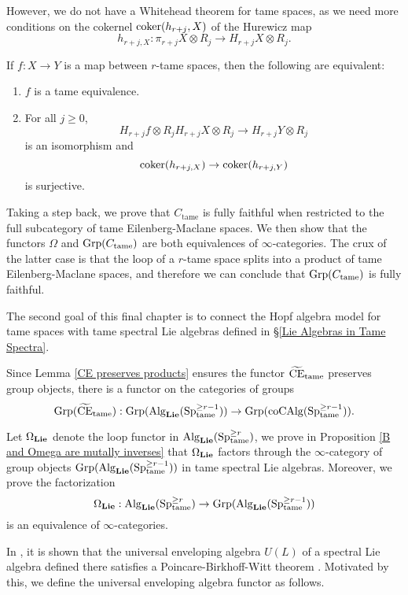 	However, we do not have a Whitehead theorem for tame spaces, as we need more conditions on the cokernel $\operatorname{coker}(h_{r+j}, X)$ of the Hurewicz map
	$$
	h_{r+j,X}: \pi_{r+j}X\otimes R_j \to 
	H_{r+j}X\otimes R_j.
	$$
	\begin{proposition}
	\cite[Proposition 1.1]{Felix-LemaireII}
	If $f:X \to Y$ is a map between $r$-tame spaces, then the following are equivalent:
\begin{enumerate}
    \item $f$ is a tame equivalence.
    \item For all $j\geq 0$, 
    $$
    H_{r+j}f \otimes R_j
    H_{r+j}X \otimes R_j
	\to 
	H_{r+j}Y \otimes R_j
    $$
    is an isomorphism and 
    $$
    \operatorname{coker}(h_{r+j,X}) \to \operatorname{coker}(h_{r+j,Y})
    $$
    is surjective.
\end{enumerate}
	\end{proposition}
	
	Taking a step back, we prove that $C_{\operatorname{tame}}$ is fully faithful when restricted to the full subcategory of tame Eilenberg-Maclane spaces.
We then show that the functors $\Omega$ and $\operatorname{Grp}(C_{\operatorname{tame}})$ are both equivalences of $\infty$-categories. 
The crux of the latter case is that the loop of a $r$-tame space splits into a product of tame Eilenberg-Maclane spaces, and therefore we can conclude that $\operatorname{Grp}(C_{\operatorname{tame}})$ is fully faithful.

The second goal of this final chapter is to connect the Hopf algebra model for tame spaces with tame spectral Lie algebras defined in \S \ref{Lie Algebras in Tame Spectra}.

Since Lemma \ref{CE preserves products} ensures the functor $\widetilde{\operatorname{CE}}_{\operatorname{\operatorname{tame}}}$ preserves group objects, there is a functor on the categories of groups
\[
	\operatorname{Grp}(\widetilde{\operatorname{CE}}_{\operatorname{\operatorname{tame}}}):
	\operatorname{Grp}(\operatorname{Alg}_{\mathbf{Lie}}(\operatorname{Sp}^{\geq r-1}_{\operatorname{\operatorname{tame}}}))
	\to 
	\operatorname{Grp}(\operatorname{coCAlg}(\operatorname{Sp}^{\geq r-1}_{\operatorname{\operatorname{tame}}})).
\]

Let $\Omega_{\mathbf{Lie}}$ denote the loop functor in $\operatorname{Alg}_{\mathbf{Lie}}(\operatorname{Sp}^{\geq r}_{\operatorname{\operatorname{tame}}}) $, we prove in Proposition \ref{B and Omega are mutally inverses} that $\Omega_{\mathbf{Lie}}$ factors through the $\infty$-category of group objects $\operatorname{Grp}(\operatorname{Alg}_{\mathbf{Lie}}(\operatorname{Sp}^{\geq r-1}_{\operatorname{\operatorname{tame}}}))$ in tame spectral Lie algebras. Moreover, we prove the factorization
$$
\Omega_{\mathbf{Lie}}: \operatorname{Alg}_{\mathbf{Lie}}(\operatorname{Sp}^{\geq r}_{\operatorname{\operatorname{tame}}})
\to 
\operatorname{Grp}(\operatorname{Alg}_{\mathbf{Lie}}(\operatorname{Sp}^{\geq r-1}_{\operatorname{\operatorname{tame}}}))
$$
is an equivalence of $\infty$-categories.

In \cite{KnudsenHEA}, it is shown that the universal enveloping algebra $U(L)$ of a spectral Lie algebra defined there satisfies a Poincare-Birkhoff-Witt theorem
\cite[Theorem B]{KnudsenHEA}.
Motivated by this, we define the universal enveloping algebra functor as follows.


